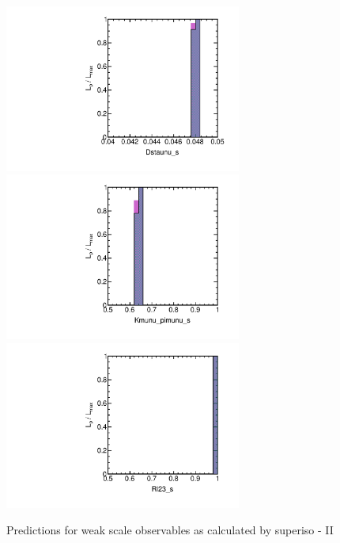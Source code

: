 \begin{figure}[htbp]
\begin{center}
\includegraphics[height=5.5cm]{figs/fig_Dstaunu_s.pdf} 
\includegraphics[height=5.5cm]{figs/fig_Kmunu_pimunu_s.pdf} \\
\includegraphics[height=5.5cm]{figs/fig_Rl23_s.pdf} 
\caption{Predictions for weak scale observables as calculated by superiso - II}
\label{default}
\end{center}
\end{figure}






